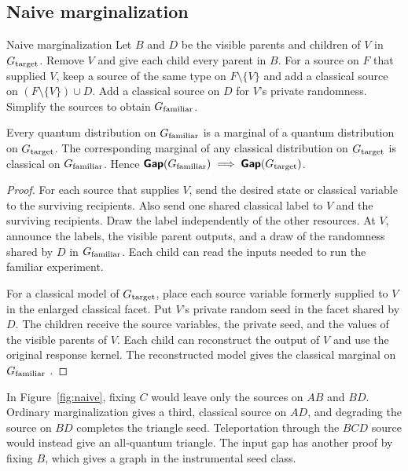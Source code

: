 \subsection{Naive marginalization}\label{sec:naive}
\begin{piggyback}{Naive marginalization}
Let \(B\) and \(D\) be the visible parents and children of \(V\) in
\(G_{\text{target}}\). Remove \(V\) and give each child every parent in \(B\).
For a source on \(F\) that supplied \(V\), keep a source of the same type on
\(F\setminus\{V\}\) and add a classical source on \((F\setminus\{V\})\cup D\).
Add a classical source on \(D\) for \(V\)'s private randomness. Simplify\footnotemark{} the
sources to obtain \(G_{\text{familiar}}\).
\end{piggyback}
\begin{proposition}\label{prop:naive}
Every quantum distribution on \(G_{\text{familiar}}\) is a marginal of a quantum
distribution on \(G_{\text{target}}\). The corresponding marginal of any classical
distribution on \(G_{\text{target}}\) is classical on \(G_{\text{familiar}}\). Hence
\(\operatorname{\text{\normalfont\sffamily\bfseries Gap}}(G_{\text{familiar}})\implies\operatorname{\text{\normalfont\sffamily\bfseries Gap}}(G_{\text{target}})\).
\end{proposition}
\begin{proof}
For each source that supplies \(V\), send the desired state or classical
variable to the surviving recipients. Also send one shared classical label
to \(V\) and the surviving recipients. Draw the label independently of the
other resources. At \(V\), announce the labels, the
visible parent outputs, and a draw of the randomness shared by \(D\) in
\(G_{\text{familiar}}\). Each child can read the inputs needed to run the familiar
experiment.

For a classical model of \(G_{\text{target}}\), place each source variable formerly
supplied to \(V\) in the enlarged classical facet. Put \(V\)'s private random
seed in the facet shared by \(D\). The children receive the source variables,
the private seed, and the values of the visible parents of \(V\). Each child
can reconstruct the output of \(V\) and use the original response kernel.
The reconstructed model gives the classical marginal on \(G_{\text{familiar}}\)
\cite{Evans}.
\end{proof}
In Figure~\ref{fig:naive}, fixing \(C\) would leave only the sources on
\(AB\) and \(BD\). Ordinary marginalization gives a third, classical
source on \(AD\), and degrading the source on \(BD\) completes the
triangle seed. Teleportation through the \(BCD\) source would instead
give an all-quantum triangle. The input gap has another proof by fixing
\(B\), which gives a graph in the instrumental seed class.

